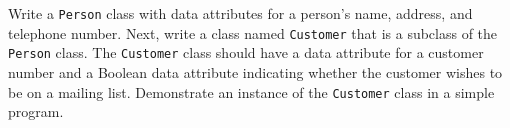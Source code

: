 Write a \texttt{Person} class with data attributes for a person's name, address, and telephone number. Next, write a class named \texttt{Customer} that is a subclass of the \texttt{Person} class. The \texttt{Customer} class should have a data attribute for a customer number and a Boolean data attribute indicating whether the customer wishes to be on a mailing list. Demonstrate an instance of the \texttt{Customer} class in a simple program.
